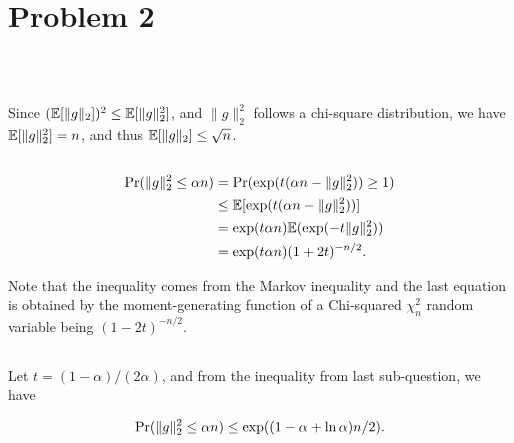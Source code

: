 \section{Problem 2}~\label{sec:prob2}

\subsection{} %

Since $({\mathbb{E}}[\|g\|_2])^2 \le {\mathbb{E}}[\|g\|_2^2]$,
and $\|g\|_2^2$ follows a chi-square distribution,
we have ${\mathbb{E}}[\|g\|_2^2]=n$,
and thus ${\mathbb{E}}[\|g\|_2]\le \sqrt{n}$.

\subsection{} %

\begin{equation}
\begin{split}
{\text{Pr}}(\|g\|_2^2\le\alpha n) & = {\text{Pr}}(\exp(t(\alpha n-\|g\|_2^2))\ge 1) \\
    & \le  {\mathbb{E}}[\exp(t(\alpha n-\|g\|_2^2))]  \\
    & = \exp(t\alpha n) {\mathbb{E}}(\exp(-t\|g\|_2^2))   \\
    & = \exp(t\alpha n) (1+2t)^{-n/2}. \\
\end{split}
\end{equation}

Note that the inequality comes from the Markov inequality and
the last equation is obtained by the moment-generating
function of a Chi-squared $\chi^2_n$ random variable
being $(1-2t)^{-n/2}$.

\subsection{} %

Let $t=(1-\alpha)/(2\alpha)$,
and from the inequality from last sub-question,
we have

\begin{equation}
    {\text{Pr}}(\|g\|_2^2\le\alpha n) \le \exp((1-\alpha + \ln \alpha)n/2).
\end{equation}

